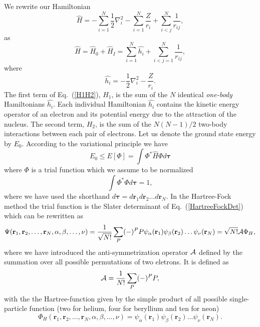 We rewrite our Hamiltonian 
\[
  \hat{H} = -\sum_{i=1}^N \frac{1}{2} \nabla^2_i 
  - \sum_{i=1}^N \frac{Z}{r_i} + \sum_{i<j}^N \frac{1}{r_{ij}},
\]
as
\begin{equation}
    \hat{H} = \hat{H}_0 + \hat{H}_I 
    = \sum_{i=1}^N\hat{h_i} + \sum_{i<j=1}^N\frac{1}{r_{ij}},
\label{H1H2}
\end{equation}
where
\begin{equation}
  \hat{h_i} = - \frac{1}{2} \nabla^2_i - \frac{Z}{r_i}.
\label{hi}
\end{equation}
The first term of Eq.~(\ref{H1H2}), $H_1$, is the sum of the $N$
identical \emph{one-body} Hamiltonians $\hat{h_i}$. Each individual
Hamiltonian $\hat{h_i}$ contains the kinetic energy operator of an
electron and its potential energy due to the attraction of the
nucleus. The second term, $H_2$, is the sum of the $N(N-1)/2$
two-body interactions between each pair of electrons.
Let us denote the ground state energy by $E_0$. According to the
variational principle we have
\begin{equation}
  E_0 \le E[\Phi] = \int \Phi^*\hat{H}\Phi d\mathbf{\tau}
\end{equation}
where $\Phi$ is a trial function which we assume to be normalized
\begin{equation}
  \int \Phi^*\Phi d\mathbf{\tau} = 1,
\end{equation}
where we have used the shorthand $d\mathbf{\tau}=d\mathbf{r}_1d\mathbf{r}_2\dots d\mathbf{r}_N$.
In the Hartree-Fock method the trial function is the Slater
determinant of Eq.~(\ref{HartreeFockDet}) which can be rewritten as 
\begin{equation}
  \Psi(\mathbf{r}_1,\mathbf{r}_2,\dots,\mathbf{r}_N,\alpha,\beta,\dots,\nu) = \frac{1}{\sqrt{N!}}\sum_{P} (-)^PP\psi_{\alpha}(\mathbf{r}_1)
    \psi_{\beta}(\mathbf{r}_2)\dots\psi_{\nu}(\mathbf{r}_N)=\sqrt{N!}{\cal A}\Phi_H,
\label{HartreeFockPermutation}
\end{equation}
where we have introduced the anti-symmetrization operator ${\cal A}$ defined by the 
summation over all possible permutations of two eletrons.
It is defined as
\begin{equation}
  {\cal A} = \frac{1}{N!}\sum_{P} (-)^PP,
\label{antiSymmetryOperator}
\end{equation}
with the the Hartree-function given by the simple product of all possible single-particle function (two for helium, four for beryllium and ten for
neon)
\begin{equation}
  \Phi_H(\mathbf{r}_1,\mathbf{r}_2,\dots,\mathbf{r}_N,\alpha,\beta,\dots,\nu) =
  \psi_{\alpha}(\mathbf{r}_1)
    \psi_{\beta}(\mathbf{r}_2)\dots\psi_{\nu}(\mathbf{r}_N).
\end{equation}

